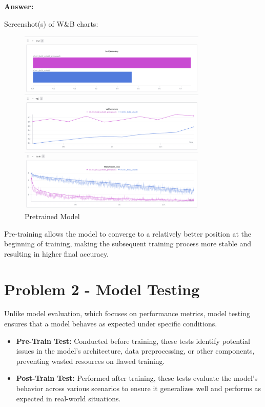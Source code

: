 \documentclass[11pt, oneside]{article}   	%
\begin{document}
\begin{answerbox} \textbf{Answer:} \vspace*{1cm}


Screenshot(s) of W\&B charts:

\begin{figure}[h]
    \centering
    \includegraphics[width=0.8\textwidth]{images/pretrained.png}
    \caption{Pretrained Model}
\end{figure}

Pre-training allows the model to converge to a relatively better position at the beginning of training, making the subsequent training process more stable and resulting in higher final accuracy.

\end{answerbox}


\clearpage

\section*{Problem 2 - Model Testing}
Unlike model evaluation, which focuses on performance metrics, model testing ensures that a model behaves as expected under specific conditions.

\begin{itemize}
    \item \textbf{Pre-Train Test:} Conducted before training, these tests identify potential issues in the model's architecture, data preprocessing, or other components, preventing wasted resources on flawed training.
    \item \textbf{Post-Train Test:} Performed after training, these tests evaluate the model's behavior across various scenarios to ensure it generalizes well and performs as expected in real-world situations.
    
\end{itemize}
\end{document}

